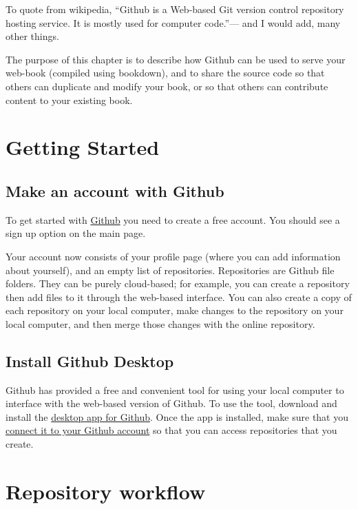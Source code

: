 \documentclass[]{book}
\theoremstyle{definition}
\theoremstyle{definition}
\theoremstyle{definition}
\theoremstyle{remark}
\begin{document}
To quote from wikipedia, ``Github is a Web-based Git version control
repository hosting service. It is mostly used for computer code.''---
and I would add, many other things.

The purpose of this chapter is to describe how Github can be used to
serve your web-book (compiled using bookdown), and to share the source
code so that others can duplicate and modify your book, or so that
others can contribute content to your existing book.

\section{Getting Started}\label{getting-started}

\subsection{Make an account with
Github}\label{make-an-account-with-github}

To get started with \href{https://github.com}{Github} you need to create
a free account. You should see a sign up option on the main page.

Your account now consists of your profile page (where you can add
information about yourself), and an empty list of repositories.
Repositories are Github file folders. They can be purely cloud-based;
for example, you can create a repository then add files to it through
the web-based interface. You can also create a copy of each repository
on your local computer, make changes to the repository on your local
computer, and then merge those changes with the online repository.

\subsection{Install Github Desktop}\label{install-github-desktop}

Github has provided a free and convenient tool for using your local
computer to interface with the web-based version of Github. To use the
tool, download and install the \href{https://desktop.github.com}{desktop
app for Github}. Once the app is installed, make sure that you
\href{https://help.github.com/desktop/guides/getting-started-with-github-desktop/authenticating-to-github/}{connect
it to your Github account} so that you can access repositories that you
create.

\section{Repository workflow}\label{repository-workflow}
\end{document}
